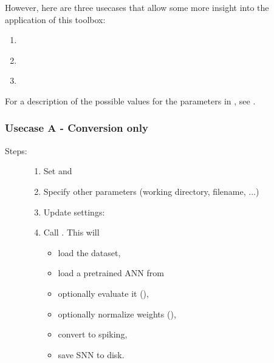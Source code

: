 \documentclass[letterpaper,10pt,english]{sphinxmanual}
\begin{document}
However, here are three usecases that allow some more insight into the application of this toolbox:
\begin{enumerate}
\item {} 
{\hyperref[getting_started:conversion\string-only]{}}

\item {} 
{\hyperref[getting_started:simulation\string-only]{}}

\item {} 
{\hyperref[getting_started:parameter\string-sweep]{}}

\end{enumerate}

For a description of the possible values for the parameters in ,
see {\hyperref[configure_toolbox::doc]{}}.
\label{getting_started:conversion-only}

\subsubsection{Usecase A - Conversion only}
\label{getting_started:usecase-a-conversion-only}\label{getting_started:conversion-only}\label{getting_started:spiking-network}\begin{description}
\item[{Steps:}] \leavevmode\begin{enumerate}
\item {} 
Set  and 

\item {} 
Specify other parameters (working directory, filename, ...)

\item {} 
Update settings: 

\item {} 
Call . This will
\begin{itemize}
\item {} 
load the dataset,

\item {} 
load a pretrained ANN from 

\item {} 
optionally evaluate it (),

\item {} 
optionally normalize weights (),

\item {} 
convert to spiking,

\item {} 
save SNN to disk.

\end{itemize}

\end{enumerate}

\end{description}
\label{getting_started:simulation-only}
\end{document}
